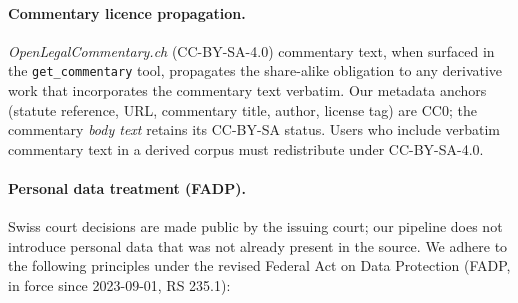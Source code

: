 \paragraph{Commentary licence propagation.}

\emph{OpenLegalCommentary.ch} (CC-BY-SA-4.0) commentary text, when surfaced in the \texttt{get\_commentary} tool, propagates the share-alike obligation to any derivative work that incorporates the commentary text verbatim. Our metadata anchors (statute reference, URL, commentary title, author, license tag) are CC0; the commentary \emph{body text} retains its CC-BY-SA status. Users who include verbatim commentary text in a derived corpus must redistribute under CC-BY-SA-4.0.

\paragraph{Personal data treatment (FADP).} Swiss court decisions are
made public by the issuing court; our pipeline does not introduce
personal data that was not already present in the source. We adhere
to the following principles under the revised Federal Act on Data
Protection (FADP, in force since 2023-09-01, RS 235.1):

